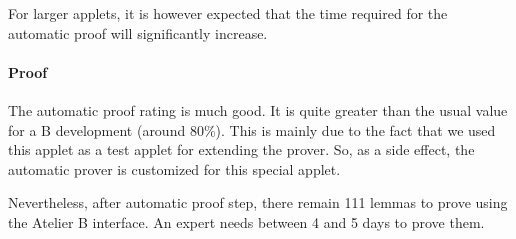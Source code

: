 For larger applets, it is however expected that the time required for the automatic proof will significantly
increase.
\paragraph{Proof}
The automatic proof rating is much good.  It is quite greater than the usual value for a B development (around
80\%).  This is mainly due to the fact that we used this applet as a test applet for extending the prover. So,
as a side effect, the automatic prover is customized for this special applet.

Nevertheless, after automatic proof step, there remain 111 lemmas to prove using the Atelier B interface.  An
expert needs between 4 and 5 days to prove them.

